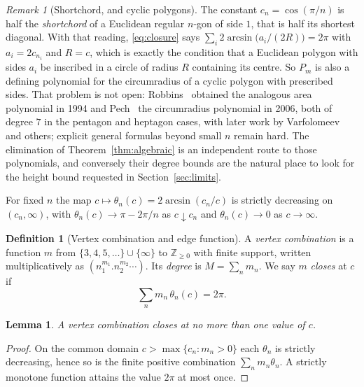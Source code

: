 \documentclass[11pt,a4paper]{article}
\theoremstyle{plain}
\newtheorem{lemma}[theorem]{Lemma}
\theoremstyle{definition}
\newtheorem{definition}[theorem]{Definition}
\theoremstyle{remark}
\newtheorem{remark}[theorem]{Remark}
\newcommand{\ZZ}{\mathbb{Z}}
\newcommand{\vc}[1]{(#1)}
\begin{document}
\begin{remark}[Shortchord, and cyclic polygons]\label{rem:shortchord}
The constant $c_n=\cos(\pi/n)$ is half the \emph{shortchord} of a Euclidean
regular $n$-gon of side $1$, that is half its shortest diagonal. With that
reading, \eqref{eq:closure} says
$\sum_i 2\arcsin\bigl(a_i/(2R)\bigr)=2\pi$ with $a_i=2c_{n_i}$ and $R=c$, which
is exactly the condition that a Euclidean polygon with sides $a_i$ be inscribed
in a circle of radius $R$ containing its centre. So $P_m$ is also a defining
polynomial for the circumradius of a cyclic polygon with prescribed sides. That
problem is not open: Robbins~\cite{robbins} obtained the analogous area
polynomial in 1994 and Pech~\cite{pech} the circumradius polynomial in 2006,
both of degree $7$ in the pentagon and heptagon cases, with later work by
Varfolomeev and others; explicit general formulas beyond small $n$ remain hard.
The elimination of Theorem~\ref{thm:algebraic} is an independent route to those
polynomials, and conversely their degree bounds are the natural place to look for
the height bound requested in Section~\ref{sec:limits}.
\end{remark}

For fixed $n$ the map $c\mapsto\theta_n(c)=2\arcsin(c_n/c)$ is strictly
decreasing on $(c_n,\infty)$, with $\theta_n(c)\to\pi-2\pi/n$ as $c\downarrow c_n$
and $\theta_n(c)\to0$ as $c\to\infty$.

\begin{definition}[Vertex combination and edge function]
A \emph{vertex combination} is a function $m$ from $\{3,4,5,\dots\}\cup\{\infty\}$
to $\ZZ_{\ge0}$ with finite support, written multiplicatively as
$\vc{n_1^{m_1}.n_2^{m_2}\cdots}$. Its \emph{degree} is $M=\sum_n m_n$. We say $m$
\emph{closes} at $c$ if
\begin{equation}\label{eq:closure}
  \sum_n m_n\,\theta_n(c)=2\pi .
\end{equation}
\end{definition}

\begin{lemma}\label{lem:unique}
A vertex combination closes at no more than one value of $c$.
\end{lemma}

\begin{proof}
On the common domain $c>\max\{c_n: m_n>0\}$ each $\theta_n$ is strictly
decreasing, hence so is the finite positive combination
$\sum_n m_n\theta_n$. A strictly monotone function attains the value $2\pi$ at
most once.
\end{proof}
\end{document}
